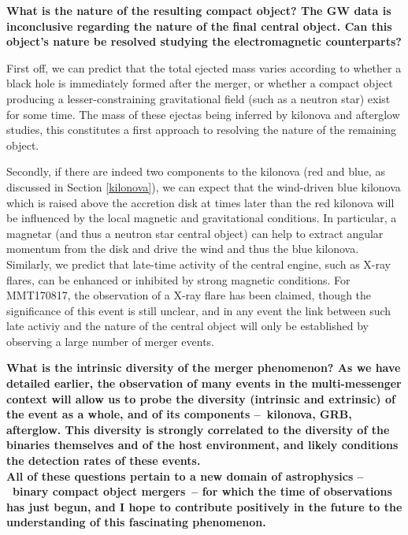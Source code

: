 \bf{What is the nature of the resulting compact object? }The GW data is inconclusive regarding the nature of the final central object. Can this object's nature be resolved studying the electromagnetic counterparts?

First off, we can predict that the total ejected mass varies according to whether a black hole is immediately formed after the merger, or whether a compact object producing a lesser-constraining gravitational field (such as a neutron star) exist for some time. The mass of these ejectas being inferred by kilonova and afterglow studies, this constitutes a first approach to resolving the nature of the remaining object.

Secondly, if there are indeed two components to the kilonova (red and blue, as discussed in Section \ref{kilonova}), we can expect that the wind-driven blue kilonova which is raised above the accretion disk at times later than the red kilonova will be influenced by the local magnetic and gravitational conditions. In particular, a magnetar (and thus a neutron star central object) can help to extract angular momentum from the disk and drive the wind and thus the blue kilonova. Similarly, we predict that late-time activity of the central engine, such as X-ray flares, can be enhanced or inhibited by strong magnetic conditions. For MMT170817, the observation of a X-ray flare has been claimed, though the significance of this event is still unclear, and in any event the link between such late activiy and the nature of the central object will only be established by observing a large number of merger events.


\bf{What is the intrinsic diversity of the merger phenomenon? }As we have detailed earlier, the observation of many events in the multi-messenger context will allow us to probe the diversity (intrinsic and extrinsic) of the event as a whole, and of its components --~kilonova, GRB, afterglow. This diversity is strongly correlated to the diversity of the binaries themselves and of the host environment, and likely conditions the detection rates of these events.\\

All of these questions pertain to a new domain of astrophysics --~binary compact object mergers~-- for which the time of observations has just begun, and I hope to contribute positively in the future to the understanding of this fascinating phenomenon.
